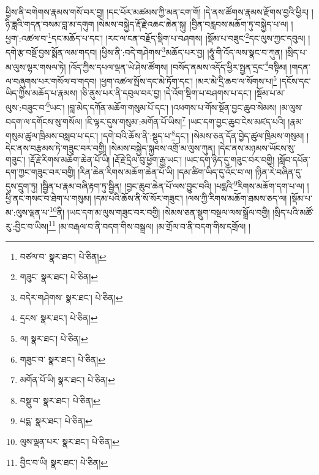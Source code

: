 ཕྱིས་ནི་བགེགས་རྣམས་གསོ་བར་བྱ། །དང་པོར་མཚམས་ཀྱི་མན་ངག་གོ། །དེ་ནས་ཚོགས་རྣམས་རྫོགས་བྱའི་ཕྱིར། །ཉི་ཟླའི་གདན་བསམ་བླ་མ་དགུག །སེམས་བསྐྱེད་རྡོ་རྗེ་འཆང་ཆེན་སྐུ། །བྱིན་བརླབས་མཆོག་ཏུ་བསྐྱེད་པ་ལ། །ཕྱག་:འཚལ་བ་\footnote{བཙལ་བ་  སྣར་ཐང་།  པེ་ཅིན། }དང་མཆོད་པ་དང་། །རང་ལ་ངན་བརྗོད་སྡིག་པ་བཤགས། །སྡོམ་པ་བཟུང་\footnote{གཟུང་  སྣར་ཐང་།  པེ་ཅིན། }དང་ལུས་ཀྱང་དབུལ། །དགེ་རྩ་བསྔོ་བྱས་སྨོན་ལམ་གདབ། །ཕྱིས་ནི་:བདེ་གཤེགས་\footnote{བདེར་གཤེགས་  སྣར་ཐང་།  པེ་ཅིན། }མཆོད་པར་བྱ། །ཧཱུཾ་གི་འོད་ལས་སྣང་བ་ཀུན། །སྲིད་པ་མ་ལུས་ལྷར་གསལ་ཏེ། །འོད་ཀྱིས་དཔལ་ལྡན་ཡེ་ཤེས་ཚོགས། །བསོད་ནམས་འདོད་ཕྱིར་སྤྱན་དྲང་\footnote{དྲངས་  སྣར་ཐང་།  པེ་ཅིན། }བསྟིམ། །གདན་ལ་བཞུགས་པར་གསོལ་བ་གདབ། །ཕྱག་འཚལ་སྤོས་དང་མེ་ཏོག་དང་། །མར་མེ་དྲི་ཆབ་ལ་སོགས་པ།\footnote{ལ།  སྣར་ཐང་།  པེ་ཅིན། } །དངོས་དང་ཡིད་ཀྱིས་མཆོད་པ་རྣམས། །ཅི་ནུས་པར་ནི་དབུལ་བར་བྱ། །དེ་འོག་སྡིག་པ་བཤགས་པ་དང་། །སྡོམ་པ་མ་ལུས་:བཟུང་བ་\footnote{གཟུང་བ་  སྣར་ཐང་།  པེ་ཅིན། }ཡང་། །བླ་མེད་དཀོན་མཆོག་གསུམ་པོ་དང་། །འཕགས་པ་གོས་སྔོན་བྱང་ཆུབ་སེམས། །མ་ལུས་བདག་ལ་དགོངས་སུ་གསོལ། །ཇི་ལྟར་དུས་གསུམ་:མགོན་པོ་ཡིས།\footnote{མགོན་པོ་ཡི།  སྣར་ཐང་།  པེ་ཅིན། } །ཡང་དག་བྱང་ཆུབ་ངེས་མཛད་པའི། །རྣམ་གསུམ་ཚུལ་ཁྲིམས་བསླབ་པ་དང་། །དགེ་བའི་ཆོས་ནི་:སྡུད་པ་\footnote{བསྡུ་བ་  སྣར་ཐང་།  པེ་ཅིན། }དང་། །སེམས་ཅན་དོན་བྱེད་ཚུལ་ཁྲིམས་གསུམ། །དེང་ནས་བརྩམས་ཏེ་གཟུང་བར་བགྱི། །སེམས་བསྐྱེད་སྐྱབས་འགྲོ་མ་ལུས་ཀུན། །དེང་ནས་མཉམས་ཡོངས་སུ་གཟུང་། །རྡོ་རྗེ་རིགས་མཆོག་ཆེན་པོ་ཡི། །རྡོ་རྗེ་དྲིལ་བུ་ཕྱག་རྒྱ་ཡང་། །ཡང་དག་ཉིད་དུ་གཟུང་བར་བགྱི། །སློབ་དཔོན་དག་ཀྱང་གཟུང་བར་བགྱི། །རིན་ཆེན་རིགས་མཆོག་ཆེན་པོ་ཡི། །དམ་ཚིག་ཡིད་དུ་འོང་བ་ལ། །ཉིན་རེ་བཞིན་དུ་དུས་དྲུག་ཏུ། །སྦྱིན་པ་རྣམ་བཞི་རྟག་ཏུ་སྦྱིན། །བྱང་ཆུབ་ཆེན་པོ་ལས་བྱུང་བའི། །པདྨའི་\footnote{པདྨ་  སྣར་ཐང་།  པེ་ཅིན། }རིགས་མཆོག་དག་པ་ལ། །ཕྱི་ནང་གསང་བ་ཐེག་པ་གསུམ། །དམ་པའི་ཆོས་ནི་སོ་སོར་གཟུང་། །ལས་ཀྱི་རིགས་མཆོག་ཐམས་ཅད་ལ། །སྡོམ་པ་མ་:ལུས་ལྡན་པ་\footnote{ལུས་ལྡན་པར་  སྣར་ཐང་།  པེ་ཅིན། }ནི། །ཡང་དག་མ་ལུས་གཟུང་བར་བགྱི། །སེམས་ཅན་སྡུག་བསྔལ་ལས་སྒྲོལ་བགྱི། །སྲིད་པའི་མཚོ་རུ་:བྱིང་བ་ཡིས།\footnote{བྱིང་བ་ཡི།  སྣར་ཐང་།  པེ་ཅིན། } །མ་བརྒལ་བ་ནི་བདག་གིས་བསྒྲལ། །མ་གྲོལ་བ་ནི་བདག་གིས་དགྲོལ། །
